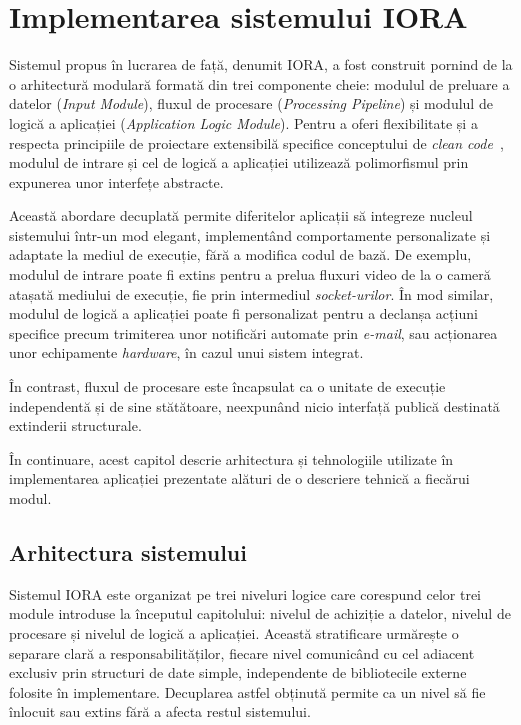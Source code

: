 \chapter{Implementarea sistemului IORA}\label{chap:implementare}
\indent\par
Sistemul propus în lucrarea de față, denumit IORA, a fost construit pornind de la o arhitectură modulară formată din trei componente cheie: modulul de preluare a datelor (\textit{Input Module}), fluxul de procesare (\textit{Processing Pipeline}) și modulul de logică a aplicației (\textit{Application Logic Module}). Pentru a oferi flexibilitate și a respecta principiile de proiectare extensibilă specifice conceptului de \textit{clean code}~\cite{codecomplete}, modulul de intrare și cel de logică a aplicației utilizează polimorfismul prin expunerea unor interfețe abstracte.

Această abordare decuplată permite diferitelor aplicații să integreze nucleul sistemului într-un mod elegant, implementând comportamente personalizate și adaptate la mediul de execuție, fără a modifica codul de bază. De exemplu, modulul de intrare poate fi extins pentru a prelua fluxuri video de la o cameră atașată mediului de execuție, fie prin intermediul \textit{socket-urilor}. În mod similar, modulul de logică a aplicației poate fi personalizat pentru a declanșa acțiuni specifice precum trimiterea unor notificări automate prin \textit{e-mail}, sau acționarea unor echipamente \textit{hardware}, în cazul unui sistem integrat.

În contrast, fluxul de procesare este încapsulat ca o unitate de execuție independentă și de sine stătătoare, neexpunând nicio interfață publică destinată extinderii structurale.

În continuare, acest capitol descrie arhitectura și tehnologiile utilizate în implementarea aplicației prezentate alături de o descriere tehnică a fiecărui modul.

\section{Arhitectura sistemului}
\indent\par
Sistemul IORA este organizat pe trei niveluri logice care corespund celor trei module introduse la începutul capitolului: nivelul de achiziție a datelor, nivelul de procesare și nivelul de logică a aplicației. Această stratificare urmărește o separare clară a responsabilităților, fiecare nivel comunicând cu cel adiacent exclusiv prin structuri de date simple, independente de bibliotecile externe folosite în implementare. Decuplarea astfel obținută permite ca un nivel să fie înlocuit sau extins fără a afecta restul sistemului.


